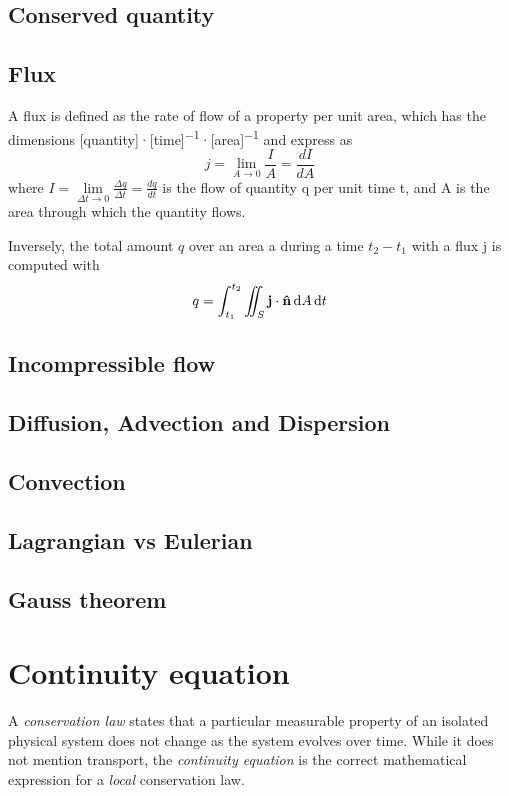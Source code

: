\documentclass[twocolumn]{article}
\numberwithin{equation}{section}
\begin{document}
		\subsection{Conserved quantity}

		\subsection{Flux}
A flux is defined as the rate of flow of a property per unit area, which has the dimensions [quantity]·[time]\textsuperscript{−1}·[area]\textsuperscript{−1} and express as
$$\boxed{j = \lim \limits_{A \rightarrow 0}\frac{I}{A}=\frac{dI}{dA}}$$
where $I = \lim\limits_{\Delta t \rightarrow 0}\frac{\Delta q}{ \Delta t} = \frac{dq}{dt}$ is the flow of quantity q per unit time t, and A is the area through which the quantity flows.

Inversely, the total amount $q$ over an area a during a time $t_2-t_1$ with a flux j is computed with
$$q=\int_{t_1}^{t_2}\iint_S \mathbf{j}\cdot\mathbf{\hat{n}}\,{\rm d}A\,{\rm d}t $$

		\subsection{Incompressible flow}

		\subsection{Diffusion, Advection and Dispersion}
		
		\subsection{Convection}
		
		\subsection{Lagrangian vs Eulerian}

		\subsection{Gauss theorem}





\newpage
	\section{Continuity equation}
A \textit{conservation law} states that a particular measurable property of an isolated physical system does not change as the system evolves over time. While it does not mention transport, the \textit{continuity equation} is the correct mathematical expression for a \textit{local} conservation law.
\end{document}
